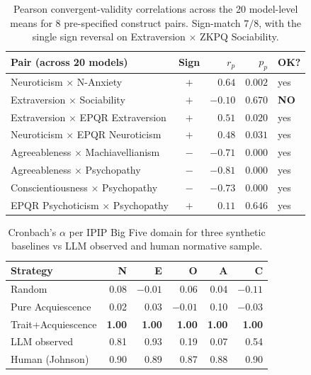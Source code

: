 \documentclass[11pt]{article}
\begin{document}
\begin{table}[t]
\centering
\small
\begin{tabular}{lcrrl}
\toprule
Pair (across 20 models) & Sign & $r_p$ & $p_p$ & OK? \\
\midrule
Neuroticism $\times$ N-Anxiety            & $+$ & $0.64$  & $0.002$ & yes \\
Extraversion $\times$ Sociability         & $+$ & $-0.10$ & $0.670$ & \textbf{NO} \\
Extraversion $\times$ EPQR Extraversion   & $+$ & $0.51$  & $0.020$ & yes \\
Neuroticism $\times$ EPQR Neuroticism     & $+$ & $0.48$  & $0.031$ & yes \\
Agreeableness $\times$ Machiavellianism   & $-$ & $-0.71$ & $0.000$ & yes \\
Agreeableness $\times$ Psychopathy        & $-$ & $-0.81$ & $0.000$ & yes \\
Conscientiousness $\times$ Psychopathy    & $-$ & $-0.73$ & $0.000$ & yes \\
EPQR Psychoticism $\times$ Psychopathy    & $+$ & $0.11$  & $0.646$ & yes \\
\bottomrule
\end{tabular}
\caption{Pearson convergent-validity correlations across the 20 model-level means for 8 pre-specified construct pairs. Sign-match $7/8$, with the single sign reversal on Extraversion $\times$ ZKPQ Sociability.}
\label{tab:convergent}
\end{table}

\begin{table}[t]
\centering
\small
\begin{tabular}{lrrrrr}
\toprule
Strategy            & N & E & O & A & C \\
\midrule
Random              & 0.08 & $-0.01$ & 0.06  & 0.04 & $-0.11$ \\
Pure Acquiescence   & 0.02 & 0.03  & $-0.01$ & 0.10 & $-0.03$ \\
Trait+Acquiescence  & \textbf{1.00} & \textbf{1.00} & \textbf{1.00} & \textbf{1.00} & \textbf{1.00} \\
\midrule
LLM observed        & 0.81 & 0.93 & 0.19  & 0.07 & 0.54 \\
Human (Johnson)     & 0.90 & 0.89 & 0.87  & 0.88 & 0.90 \\
\bottomrule
\end{tabular}
\caption{Cronbach's $\alpha$ per IPIP Big Five domain for three synthetic baselines vs LLM observed and human normative sample.}
\label{tab:synthetic}
\end{table}
\end{document}
